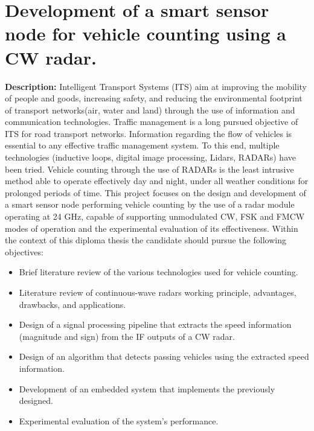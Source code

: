 \documentclass[12pt]{article}
\begin{document}
\section*{Development of a smart sensor node for vehicle counting using a CW radar.}
 
\textbf{Description:}
Intelligent Transport Systems (ITS) aim at improving the mobility of people and goods, increasing safety, and reducing the environmental footprint of transport networks(air, water and land) through the use of information and communication technologies. Traffic management is a long pursued objective of ITS for road transport networks. Information regarding the flow of vehicles is essential to any effective traffic management system. To this end, multiple technologies (inductive loops, digital image processing, Lidars, RADARs) have been tried. Vehicle counting through the use of RADARs is the least intrusive method able to operate effectively day and night, under all weather conditions for prolonged periods of time. This project focuses on the design and development of a smart sensor node performing vehicle counting by the use of a radar module operating at 24 GHz, capable of supporting unmodulated CW, FSK and FMCW modes of operation and the experimental evaluation of its effectiveness. Within the context of this diploma thesis the candidate should pursue the following objectives:

\begin{itemize}

\item Brief literature review of the various technologies used for vehicle counting.

\item Literature review of continuous-wave radars working principle, advantages, drawbacks, and applications.

\item Design of a signal processing pipeline that extracts the speed information (magnitude and sign) from the IF outputs of a CW radar.

\item Design of an algorithm that detects passing vehicles using the extracted speed information.

\item Development of an embedded system that implements the previously designed.

\item Experimental evaluation of the system's performance.

 
\end{itemize}
\end{document}
